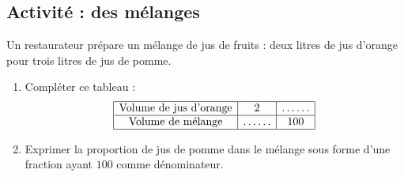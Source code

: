 
\subsection*{Activité : des mélanges}

Un restaurateur prépare un mélange de jus de fruits : deux litres de jus d'orange pour trois litres de jus de pomme. 
\begin{enumerate}
    \item
        Compléter ce tableau :
        \begin{equation*}
            \begin{array}[]{|c|c|c|}
                \hline
                \text{Volume de jus d'orange}&2&\ldots\ldots\\
                \hline
                \text{Volume de mélange}&\ldots\ldots&100\\
                \hline
            \end{array}
        \end{equation*}
    \item
        Exprimer la proportion de jus de pomme dans le mélange sous forme d'une fraction ayant \( 100\) comme dénominateur.
\end{enumerate}
